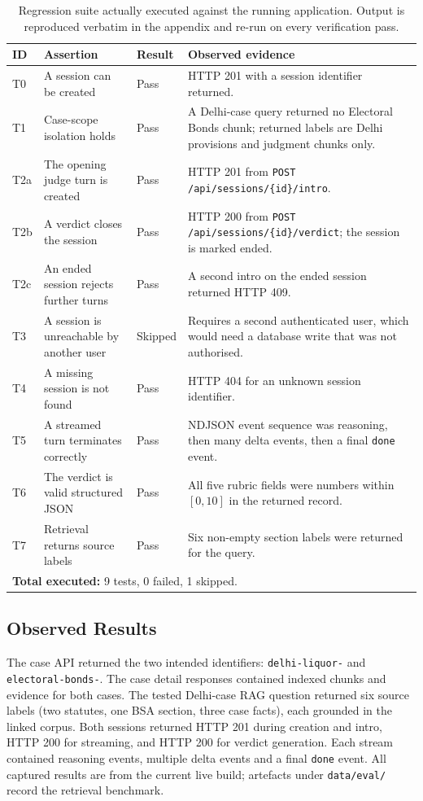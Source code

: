\documentclass[12pt]{article}
\begin{document}
\begin{table}[!htbp]
\centering
\caption{Regression suite actually executed against the running application. Output is reproduced verbatim in the appendix and re-run on every verification pass.}
\label{tab:testcases}
\begin{tabularx}{0.97\textwidth}{p{}p{}p{}X}
\toprule
ID & Assertion & Result & Observed evidence \\
\midrule
T0 & A session can be created & Pass & HTTP 201 with a session identifier returned. \\
T1 & Case-scope isolation holds & Pass & A Delhi-case query returned no Electoral Bonds chunk; returned labels are Delhi provisions and judgment chunks only. \\
T2a & The opening judge turn is created & Pass & HTTP 201 from \texttt{POST /api/sessions/\{id\}/intro}. \\
T2b & A verdict closes the session & Pass & HTTP 200 from \texttt{POST /api/sessions/\{id\}/verdict}; the session is marked ended. \\
T2c & An ended session rejects further turns & Pass & A second intro on the ended session returned HTTP 409. \\
T3 & A session is unreachable by another user & Skipped & Requires a second authenticated user, which would need a database write that was not authorised. \\
T4 & A missing session is not found & Pass & HTTP 404 for an unknown session identifier. \\
T5 & A streamed turn terminates correctly & Pass & NDJSON event sequence was reasoning, then many delta events, then a final \texttt{done} event. \\
T6 & The verdict is valid structured JSON & Pass & All five rubric fields were numbers within $[0,10]$ in the returned record. \\
T7 & Retrieval returns source labels & Pass & Six non-empty section labels were returned for the query. \\
\midrule
\multicolumn{4}{l}{\textbf{Total executed:} 9 tests, 0 failed, 1 skipped.} \\
\bottomrule
\end{tabularx}
\end{table}

\subsection{Observed Results}
The case API returned the two intended identifiers: \texttt{delhi-\allowbreak liquor-} and \texttt{electoral-\allowbreak bonds-}. The case detail responses contained indexed chunks and evidence for both cases. The tested Delhi-case RAG question returned six source labels (two statutes, one BSA section, three case facts), each grounded in the linked corpus. Both sessions returned HTTP 201 during creation and intro, HTTP 200 for streaming, and HTTP 200 for verdict generation. Each stream contained reasoning events, multiple delta events and a final \texttt{done} event. All captured results are from the current live build; artefacts under \texttt{data/eval/} record the retrieval benchmark.
\end{document}
